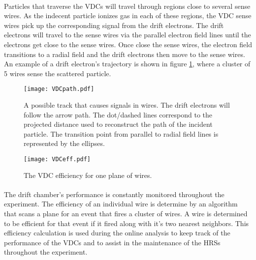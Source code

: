 	\paragraph{} Particles that traverse the VDCs will travel through regions close to several sense wires. As the indecent particle ionizes gas in each of these regions, the VDC sense wires pick up the corresponding signal from the drift electrons. The drift electrons will travel to the sense wires via the parallel electron field lines until the electrons get close to the sense wires. Once close the sense wires, the electron field transitions to a radial field and the drift electrons then move to the sense wires. An example of a drift electron's trajectory  is shown in figure \ref{vdcpath}, where a cluster of 5 wires sense the scattered particle.
	\begin{figure}[t]
		\centering
		\texttt{[image: VDCpath.pdf]}
		\caption{A possible track that causes signals in  wires. The drift electrons will follow the arrow path. The dot/dashed lines correspond to the projected distance used to reconstruct the path of the incident particle. The transition point from parallel to radial field lines is represented by the ellipses. \cite{drift} }
		\label{vdcpath}
	\end{figure}
	\begin{figure}
	\centering
	\texttt{[image: VDCeff.pdf]}
	\caption{The VDC efficiency for one plane of wires.}
	\label{vdceff}
	\end{figure}


	\paragraph{}The drift chamber's performance is constantly monitored throughout the experiment. The efficiency of an individual wire is determine by an algorithm that scans a plane for an event that fires a cluster of wires. A wire is determined to be efficient for that event if it fired along with it's two nearest neighbors. This efficiency calculation is used during the online analysis to keep track of the performance of the VDCs and to assist in the maintenance of the HRSs throughout the experiment. 

